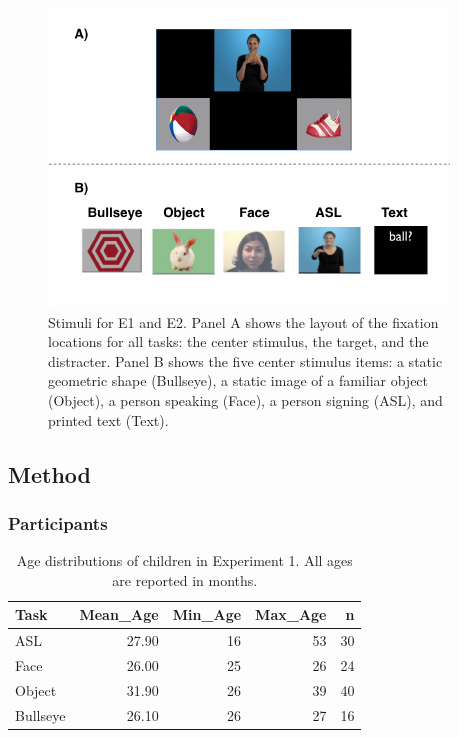\documentclass[10pt, letterpaper]{article}
\newenvironment{CodeChunk}{}{}
\begin{document}
\begin{CodeChunk}
\begin{figure}[t]

{\centering \includegraphics{figs/e1_stimuli-1} 

}

\caption[Stimuli for E1 and E2]{Stimuli for E1 and E2. Panel A shows the layout of the fixation locations for all tasks: the center stimulus, the target, and the distracter. Panel B shows the five center stimulus items: a static geometric shape (Bullseye), a static image of a familiar object (Object), a person speaking (Face), a person signing (ASL), and printed text (Text).}\label{fig:e1_stimuli}
\end{figure}
\end{CodeChunk}

\subsection{Method}\label{method}

\subsubsection{Participants}\label{participants}

\begin{table}[b]
\centering
\begin{tabular}{lrrrr}
  \hline
Task & Mean\_Age & Min\_Age & Max\_Age & n \\ 
  \hline
ASL & 27.90 &  16 &  53 &  30 \\ 
  Face & 26.00 &  25 &  26 &  24 \\ 
  Object & 31.90 &  26 &  39 &  40 \\ 
  Bullseye & 26.10 &  26 &  27 &  16 \\ 
   \hline
\end{tabular}
\caption{Age distributions of children in Experiment 1. All ages are reported in months.} 
\end{table}
\end{document}
